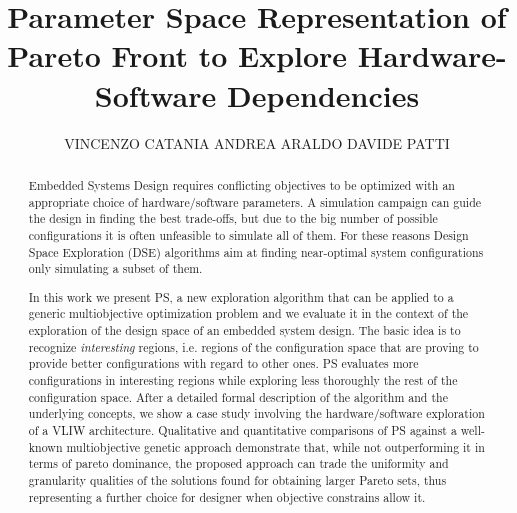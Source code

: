 \documentclass[prodmode,acmtecs]{acmsmall}
\begin{document}


\title{Parameter Space Representation of Pareto Front to
Explore Hardware-Software Dependencies}
\author{VINCENZO CATANIA
ANDREA ARALDO
DAVIDE PATTI
}

\begin{abstract}


Embedded Systems Design requires conflicting objectives to be
optimized with an appropriate choice of hardware/software parameters.
A simulation campaign can guide the design in finding the best
trade-offs, but due to the big number of possible configurations it
is often unfeasible to simulate all of them. For these reasons Design Space
Exploration (DSE) algorithms aim at finding near-optimal system
configurations only simulating a subset of them.

In this work we present PS, a new exploration
algorithm that can be applied to a generic multiobjective optimization problem and we evaluate it in the context of the exploration of the design space of an embedded system design. The basic idea is to recognize \emph{interesting} regions, i.e.
regions of the configuration space that are proving to provide better
configurations with regard to other ones. PS evaluates more configurations in
interesting regions while exploring less thoroughly the rest of the
configuration space. After a detailed formal description of the
algorithm and the underlying concepts, we show a 
case study involving the hardware/software exploration of a VLIW
architecture. Qualitative and quantitative comparisons of PS
against a well-known multiobjective genetic approach demonstrate that,
while not outperforming it in terms of pareto dominance, the proposed
approach can trade the uniformity and granularity qualities of the
solutions found for obtaining larger Pareto sets, thus representing a
further choice for designer when objective constrains allow it.
\end{abstract}
\end{document}
